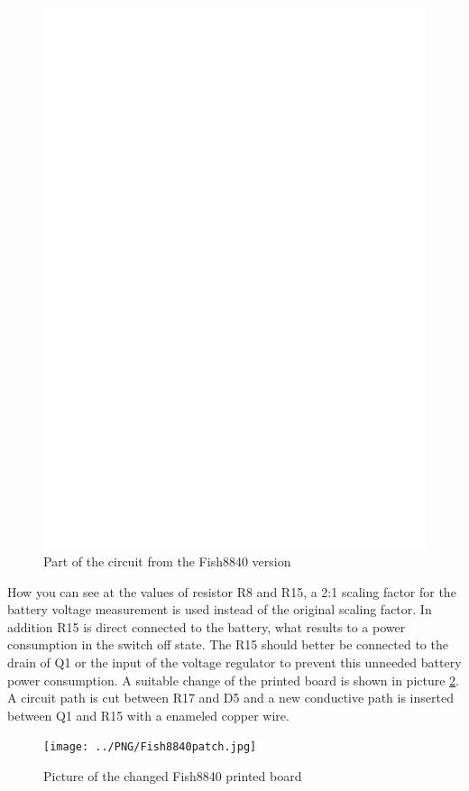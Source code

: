 \begin{figure}[H]
\centering
\includegraphics[width=12cm]{../FIG/Fish8840.eps}
\caption{Part of the circuit from the Fish8840 version}
\label{fig:Fish8840}
\end{figure}

How you can see at the values of resistor R8 and R15,
a 2:1 scaling factor for the battery voltage measurement is used instead of the original scaling factor.
In addition R15 is direct connected to the battery, what results to a power consumption in the switch off state.
The R15 should better be connected to the drain of Q1 or the input of the voltage regulator to prevent this
unneeded battery power consumption.
A suitable change of the printed board is shown in picture \ref{fig:Fish8840patch}.
A circuit path is cut between R17 and D5 and a new conductive path is inserted between Q1 and
R15 with a enameled copper wire.

\begin{figure}[H]
\centering
\texttt{[image: ../PNG/Fish8840patch.jpg]}
\caption{Picture of the changed Fish8840 printed board}
\label{fig:Fish8840patch}
\end{figure}

